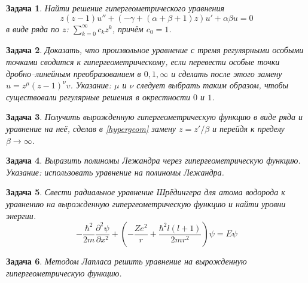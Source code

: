 \documentclass{article}
\newtheorem{problem}{Задача}
\begin{document}
\begin{problem}
    Найти решение гипергеометрического уравнения
    \begin{equation}
        \label{hypergeom}
        z(z-1)u'' + (-\gamma + (\alpha + \beta + 1)z)u' + \alpha \beta u = 0
    \end{equation}
    в виде ряда по $z$: $\sum_{k=0}^{\infty} c_k z^k$, причём $c_0 = 1$.
\end{problem}
\begin{problem}
    Доказать, что произвольное уравнение с тремя регулярными особыми точками
    сводится к гипергеометрическому, если перевести особые точки
    дробно--линейным преобразованием в $0,1, \infty$ и сделать после этого замену 
    $u = z^\mu (z-1)^\nu v$. \emph{Указание:} $\mu$ и $\nu$ следует выбрать таким образом,
    чтобы существовали регулярные решения в окрестности $0$ и $1$.
\end{problem}    
\begin{problem}
    Получить вырожденную гипергеометрическую функцию в виде ряда 
    и уравнение на неё, сделав в    
    \eqref{hypergeom} замену $z = z'/\beta$ и перейдя к пределу $\beta \to \infty$.
\end{problem}
\begin{problem}
    Выразить полиномы Лежандра через гипергеометрическую функцию. \emph{Указание}: использовать
    уравнение на полиномы Лежандра.
\end{problem}
\begin{problem}
    Свести радиальное уравнение Шрёдингера для атома водорода к уравнению на 
    вырожденную гипергеометрическую функцию
    и найти уровни энергии.
    \begin{equation}
        -\frac{\hbar^2}{2m}\frac{\partial^2 \psi}{\partial x^2} + 
            \left(-\frac{Ze^2}{r} + \frac{\hbar^2l(l+1)}{2mr^2}\right)\psi = E\psi
    \end{equation}
\end{problem}
\begin{problem}
    Методом Лапласа решить уравнение на вырожденную гипергеометрическую функцию.
\end{problem}
\end{document}
